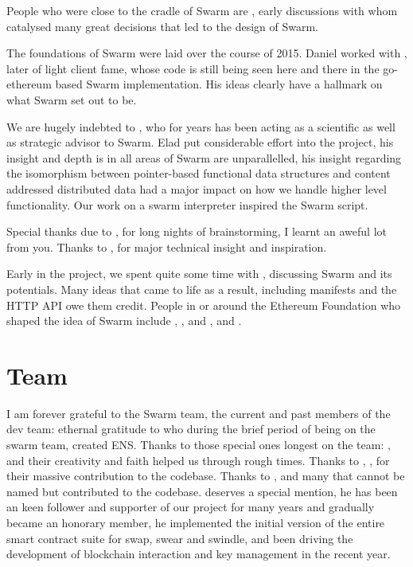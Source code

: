 People who were close to the cradle of Swarm are ,  early discussions with whom catalysed many great decisions that led to the design of Swarm.

The foundations of Swarm were laid over the course of 2015.
Daniel worked with , later of light client fame, whose code is still being seen here and there in the go-ethereum based Swarm implementation. His ideas clearly have a hallmark on what Swarm set out to be. 

We are hugely indebted to , who for years has been acting as a scientific as well as strategic advisor to Swarm. Elad put considerable effort into the project, his insight and depth is in all areas of Swarm are unparallelled, his insight regarding the isomorphism between pointer-based functional data structures and content addressed distributed data had a major impact on how we handle higher level functionality. Our work on a swarm interpreter inspired the Swarm script.

Special thanks due to ,  for long nights of brainstorming, I learnt an aweful lot from you. Thanks to ,  for major technical insight and inspiration.

Early in the project, we spent quite some time with ,  discussing Swarm and its potentials. Many ideas that came to life as a result, including manifests and the HTTP API owe them credit. People in or around the Ethereum Foundation who shaped the idea of Swarm include , ,  and ,  and . 

\section*{Team}

I am forever grateful to the Swarm team, the current and past members of the dev team: ethernal gratitude to  who during the brief period of being on the swarm team, created ENS. Thanks to those special ones longest on the team: ,  and  their creativity and faith helped us through rough  times. Thanks to , ,  for their massive contribution to the codebase. Thanks to ,  and many that cannot be named but contributed to the codebase.
 deserves a special mention, he has been an keen follower and supporter of our project for many years and gradually became an honorary member, he implemented the initial version of the entire smart contract suite for swap, swear and swindle, and been driving the development of blockchain interaction and key management in the recent year.

